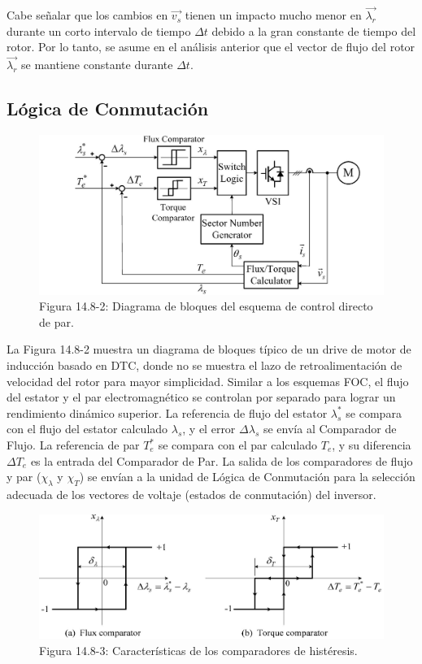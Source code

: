 \documentclass[letterpaper,12pt]{article}
\begin{document}
Cabe señalar que los cambios en $\vec{v_s}$ tienen un impacto mucho menor en $\vec{\lambda_r}$ durante un corto intervalo de tiempo $\Delta t$ debido a la gran constante de tiempo del rotor. Por lo tanto, se asume en el análisis anterior que el vector de flujo del rotor $\vec{\lambda_r}$ se mantiene constante durante $\Delta t$.

\subsection{Lógica de Conmutación}

\begin{figure}[ht]
\centering
\includegraphics{graficos/img24.jpg}
\caption{Figura 14.8-2: Diagrama de bloques del esquema de control directo de par.}
\label{fig:14.8-2}
\end{figure}
\FloatBarrier

La Figura 14.8-2 muestra un diagrama de bloques típico de un drive de motor de inducción basado en DTC, donde no se muestra el lazo de retroalimentación de velocidad del rotor para mayor simplicidad. Similar a los esquemas FOC, el flujo del estator y el par electromagnético se controlan por separado para lograr un rendimiento dinámico superior. La referencia de flujo del estator $\lambda_s^*$ se compara con el flujo del estator calculado $\lambda_s$, y el error $\Delta \lambda_s$ se envía al Comparador de Flujo. La referencia de par $T_e^*$ se compara con el par calculado $T_e$, y su diferencia $\Delta T_e$ es la entrada del Comparador de Par. La salida de los comparadores de flujo y par ($\chi_\lambda$ y $\chi_T$) se envían a la unidad de Lógica de Conmutación para la selección adecuada de los vectores de voltaje (estados de conmutación) del inversor.

\begin{figure}[ht]
\centering
\includegraphics{graficos/img25.jpg}
\caption{Figura 14.8-3: Características de los comparadores de histéresis.}
\label{fig:14.8-3}
\end{figure}
\FloatBarrier
\end{document}
